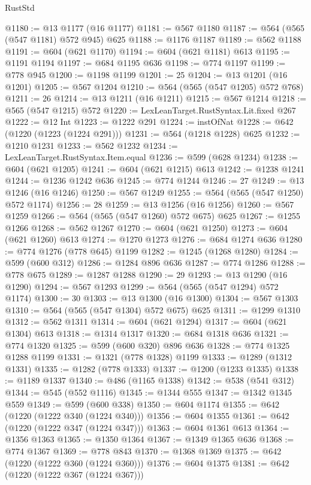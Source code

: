 \begin{lexlean}{RustStd}
\begin{coremodule}
@1180 := @13 @1177 (@16 @1177)
@1181 := @567 @1180
@1187 := @564 (@565 (@547 @1181) @572 @945) @625
@1188 := @1176 @1187
@1189 := @562 @1188
@1191 := @604 (@621 @1170)
@1194 := @604 (@621 @1181) @613
@1195 := @1191 @1194
@1197 := @684 @1195 @636
@1198 := @774 @1197
@1199 := @778 @945
@1200 := @1198 @1199
@1201 := 25
@1204 := @13 @1201 (@16 @1201)
@1205 := @567 @1204
@1210 := @564 (@565 (@547 @1205) @572 @768)
@1211 := 26
@1214 := @13 @1211 (@16 @1211)
@1215 := @567 @1214
@1218 := @565 (@547 @1215) @572
@1220 := LexLeanTarget.RustSyntax.Lit.fixed @267
@1222 := @12 Int
@1223 := @1222 @291
@1224 := instOfNat
@1228 := @642 (@1220 (@1223 (@1224 @291)))
@1231 := @564 (@1218 @1228) @625
@1232 := @1210 @1231
@1233 := @562 @1232
@1234 := LexLeanTarget.RustSyntax.Item.equal
@1236 := @599 (@628 @1234)
@1238 := @604 (@621 @1205)
@1241 := @604 (@621 @1215) @613
@1242 := @1238 @1241
@1244 := @1236 @1242 @636
@1245 := @774 @1244
@1246 := 27
@1249 := @13 @1246 (@16 @1246)
@1250 := @567 @1249
@1255 := @564 (@565 (@547 @1250) @572 @1174)
@1256 := 28
@1259 := @13 @1256 (@16 @1256)
@1260 := @567 @1259
@1266 := @564 (@565 (@547 @1260) @572 @675) @625
@1267 := @1255 @1266
@1268 := @562 @1267
@1270 := @604 (@621 @1250)
@1273 := @604 (@621 @1260) @613
@1274 := @1270 @1273
@1276 := @684 @1274 @636
@1280 := @774 @1276 (@778 @645) @1199
@1282 := @1245 (@1268 @1280)
@1284 := @599 (@600 @312)
@1286 := @1284 @896 @636
@1287 := @774 @1286
@1288 := @778 @675
@1289 := @1287 @1288
@1290 := 29
@1293 := @13 @1290 (@16 @1290)
@1294 := @567 @1293
@1299 := @564 (@565 (@547 @1294) @572 @1174)
@1300 := 30
@1303 := @13 @1300 (@16 @1300)
@1304 := @567 @1303
@1310 := @564 (@565 (@547 @1304) @572 @675) @625
@1311 := @1299 @1310
@1312 := @562 @1311
@1314 := @604 (@621 @1294)
@1317 := @604 (@621 @1304) @613
@1318 := @1314 @1317
@1320 := @684 @1318 @636
@1321 := @774 @1320
@1325 := @599 (@600 @320) @896 @636
@1328 := @774 @1325 @1288 @1199
@1331 := @1321 (@778 @1328) @1199
@1333 := @1289 (@1312 @1331)
@1335 := @1282 (@778 @1333)
@1337 := @1200 (@1233 @1335)
@1338 := @1189 @1337
@1340 := @486 (@1165 @1338)
@1342 := @538 (@541 @312)
@1344 := @545 (@552 @1116)
@1345 := @1344 @555
@1347 := @1342 @1345 @559
@1349 := @599 (@600 @338)
@1350 := @604 @1174
@1355 := @642 (@1220 (@1222 @340 (@1224 @340)))
@1356 := @604 @1355
@1361 := @642 (@1220 (@1222 @347 (@1224 @347)))
@1363 := @604 @1361 @613
@1364 := @1356 @1363
@1365 := @1350 @1364
@1367 := @1349 @1365 @636
@1368 := @774 @1367
@1369 := @778 @843
@1370 := @1368 @1369
@1375 := @642 (@1220 (@1222 @360 (@1224 @360)))
@1376 := @604 @1375
@1381 := @642 (@1220 (@1222 @367 (@1224 @367)))

\end{coremodule}
\end{lexlean}
